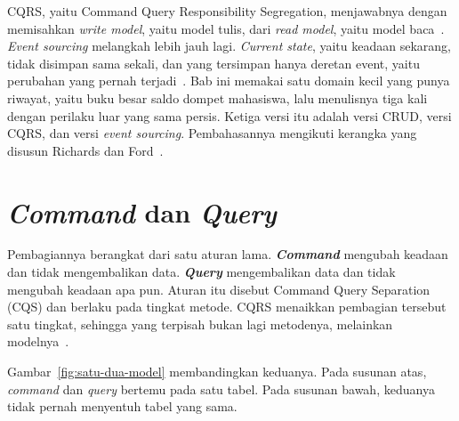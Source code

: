 CQRS, yaitu Command Query Responsibility Segregation, menjawabnya
dengan
memisahkan \textit{write model}, yaitu
model tulis, dari \textit{read model},
yaitu model baca~\cite{fowler2011cqrs,young2010cqrs}.
\textit{Event sourcing} melangkah
lebih jauh lagi. \textit{Current state}, yaitu keadaan sekarang, tidak disimpan
sama sekali, dan yang tersimpan hanya deretan event, yaitu perubahan yang pernah
terjadi~\cite{fowler2005eventsourcing}. Bab ini memakai satu domain kecil
yang punya riwayat, yaitu buku besar saldo dompet mahasiswa, lalu menulisnya
tiga kali dengan perilaku luar yang sama persis. Ketiga versi itu adalah versi
CRUD, versi CQRS, dan versi \textit{event sourcing}. Pembahasannya mengikuti kerangka
yang disusun Richards dan Ford~\cite{richards2020fundamentals}.

\section{\textit{Command} dan \textit{Query}}

Pembagiannya berangkat dari satu aturan lama. \textbf{\textit{Command}} mengubah
keadaan dan tidak mengembalikan data. \textbf{\textit{Query}} mengembalikan data dan
tidak mengubah keadaan apa pun. Aturan itu disebut Command Query Separation
(CQS) dan berlaku pada tingkat metode. CQRS menaikkan pembagian tersebut satu
tingkat, sehingga yang terpisah bukan lagi metodenya, melainkan
modelnya~\cite{fowler2011cqrs}.

Gambar~\ref{fig:satu-dua-model} membandingkan keduanya. Pada susunan atas,
\textit{command} dan \textit{query} bertemu pada satu tabel. Pada susunan bawah, keduanya tidak
pernah menyentuh tabel yang sama.

